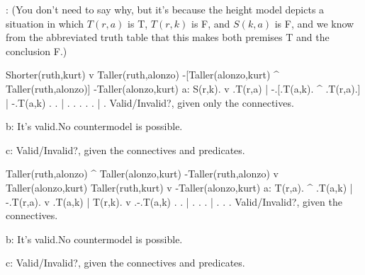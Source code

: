 :        (You don't need to say why, but it's because the height model depicts a situation in which $T(r,a)$ is T, $T(r,k)$ is F, and $S(k,a)$ is F, and we know from the abbreviated truth table that this makes both premises T and the conclusion F.)

        \endanswerlist

\argument
 Shorter(ruth,kurt) v Taller(ruth,alonzo)
 -[Taller(alonzo,kurt) ^ Taller(ruth,alonzo)]
\argumentline
 -Taller(alonzo,kurt)
\endargument
        \answerlist
        a:
        \truthtable
         S(r,k). v .T(r,a) | -.[.T(a,k). ^ .T(r,a).] | -.T(a,k)
        \truthtableline
               .   .       |  . .      .   .      .  |  .
        \endtruthtable
        Valid/Invalid?, given only the connectives.

        b: It's valid.\OR No countermodel is possible.\OR
        \heightmodel
         
        \endheightmodel

        c: Valid/Invalid?, given the connectives and predicates.
        \endanswerlist

\argument
 Taller(ruth,alonzo) ^ Taller(alonzo,kurt)
 -Taller(ruth,alonzo) v Taller(alonzo,kurt)
\argumentline
 Taller(ruth,kurt) v -Taller(alonzo,kurt) 
\endargument
        \answerlist
        a:
        \truthtable
         T(r,a). ^ .T(a,k) | -.T(r,a). v .T(a,k) | T(r,k). v .-.T(a,k)
        \truthtableline
               .   .       |  .      .   .       |       .   . .
        \endtruthtable
        Valid/Invalid?, given the connectives.

        b: It's valid.\OR No countermodel is possible.\OR
        \heightmodel
         
        \endheightmodel

        c: Valid/Invalid?, given the connectives and predicates.
        \endanswerlist

\endproblems
\bye
